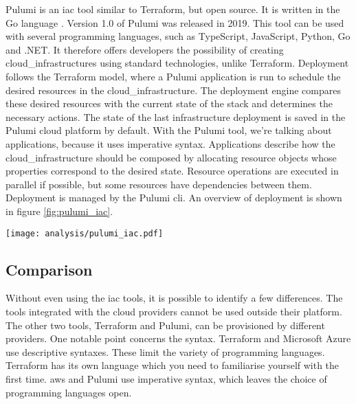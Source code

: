 Pulumi is an \acrshort{iac} tool similar to Terraform, but open source. It is written in the Go language \cite{pulumi_github}. Version 1.0 of Pulumi was released in 2019. This tool can be used with several programming languages, such as TypeScript, JavaScript, Python, Go and .NET. It therefore offers developers the possibility of creating \glspl{cloud_infrastructure} using standard technologies, unlike Terraform. Deployment follows the Terraform model, where a Pulumi application is run to schedule the desired resources in the \gls{cloud_infrastructure}. The deployment engine compares these desired resources with the current state of the stack and determines the necessary actions. The state of the last infrastructure deployment is saved in the Pulumi \Gls{cloud} platform by default. With the Pulumi tool, we're talking about applications, because it uses imperative syntax. Applications describe how the \gls{cloud_infrastructure} should be composed by allocating resource objects whose properties correspond to the desired state. Resource operations are executed in parallel if possible, but some resources have dependencies between them. Deployment is managed by the Pulumi \acrshort{cli}. An overview of deployment is shown in figure \ref{fig:pulumi_iac}. \cite{iac_tools}
\begin{center}
    \begingroup
    \texttt{[image: analysis/pulumi\_iac.pdf]}
    \label{fig:pulumi_iac}
    \endgroup
\end{center}

\subsection{Comparison}
Without even using the \acrshort{iac} tools, it is possible to identify a few differences. The tools integrated with the \gls{cloud} providers cannot be used outside their platform. The other two tools, Terraform and Pulumi, can be provisioned by different providers. One notable point concerns the syntax. Terraform and Microsoft Azure use descriptive syntaxes. These limit the variety of programming languages. Terraform has its own language which you need to familiarise yourself with the first time. \gls{aws} and Pulumi use imperative syntax, which leaves the choice of programming languages open.

